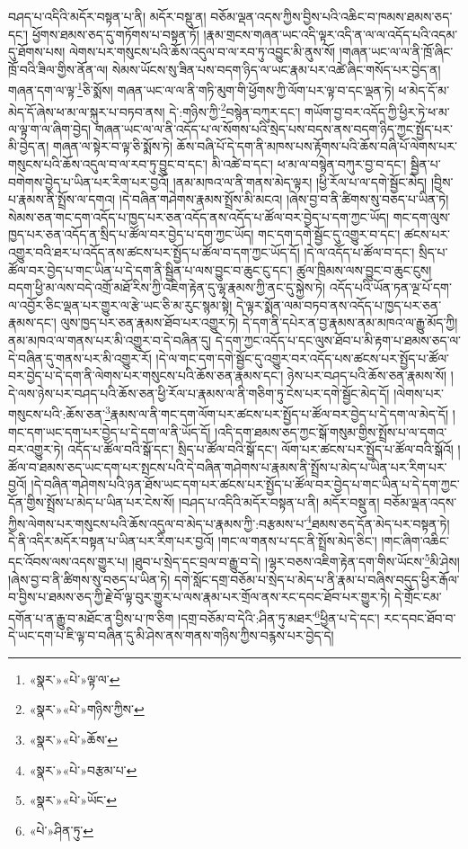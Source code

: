 བཤད་པ་འདིའི་མདོར་བསྟན་པ་ནི། མདོར་བསྡུ་ན། བཅོམ་ལྡན་འདས་ཀྱིས་བྱིས་པའི་འཆིང་བ་ཁམས་ཐམས་ཅད་དང་། ཕྱོགས་ཐམས་ཅད་དུ་གཏོགས་པ་བསྟན་ཏོ། །རྣམ་གྲངས་གཞན་ཡང་འདི་ལྟར་འདི་ན་ལ་ལ་འདོད་པའི་འདམ་དུ་ཐོགས་པས། ལེགས་པར་གསུངས་པའི་ཆོས་འདུལ་བ་ལ་རབ་ཏུ་འབྱུང་མི་ནུས་སོ། །གཞན་ཡང་ལ་ལ་ནི་ཁྲོ་ཞིང་ཁྲོ་བའི་ཟིལ་གྱིས་ནོན་ལ། སེམས་ཡོངས་སུ་ཟིན་པས་བདག་ཉིད་ལ་ཡང་རྣམ་པར་འཚེ་ཞིང་གསོད་པར་བྱེད་ན། གཞན་དག་ལ་ལྟ་\footnote{«སྣར་»«པེ་»ལྟ་ལ་}ཅི་སྨོས། གཞན་ཡང་ལ་ལ་ནི་གཏི་མུག་གི་ཕྱོགས་ཀྱི་ལོག་པར་ལྟ་བ་དང་ལྡན་ཏེ། ཕ་མེད་དོ་མ་མེད་དོ་ཞེས་ཕ་མ་ལ་སྐུར་པ་བཏབ་ནས། དེ་:གཉིས་ཀྱི་\footnote{«སྣར་»«པེ་»གཉིས་ཀྱིས་}བསྙེན་བཀུར་དང་། གཡོག་བྱ་བར་འདོད་ཀྱི་ཕྱིར་ཏེ་ཕ་མ་ལ་ལྟ་ག་ལ་ཞིག་བྱེད། གཞན་ཡང་ལ་ལ་ནི་འདོད་པ་ལ་སོགས་པའི་སྲེད་པས་བདས་ནས་བདག་ཉིད་ཀྱང་སྤྱོད་པར་མི་བྱེད་ན། གཞན་ལ་སྟེར་བ་ལྟ་ཅི་སྨོས་ཏེ། ཆོས་བཞི་པོ་དེ་དག་ནི་མཁས་པས་རྟོགས་པའི་ཆོས་བཞི་པོ་ལེགས་པར་གསུངས་པའི་ཆོས་འདུལ་བ་ལ་རབ་ཏུ་བྱུང་བ་དང་། མི་འཚེ་བ་དང་། ཕ་མ་ལ་བསྙེན་བཀུར་བྱ་བ་དང་། སྦྱིན་པ་བགེགས་བྱེད་པ་ཡིན་པར་རིག་པར་བྱའོ། །ནམ་མཁའ་ལ་ནི་གནས་མེད་ལྟར། །ཕྱི་རོལ་པ་ལ་དགེ་སྦྱོང་མེད། །བྱིས་པ་རྣམས་ནི་སྤྲོས་ལ་དགའ། །དེ་བཞིན་གཤེགས་རྣམས་སྤྲོས་མི་མངའ། །ཞེས་བྱ་བ་ནི་ཚིགས་སུ་བཅད་པ་ཡིན་ཏེ། སེམས་ཅན་གང་དག་འདོད་པ་ཁྱད་པར་ཅན་འདོད་ནས་འདོད་པ་ཚོལ་བར་བྱེད་པ་དག་ཀྱང་ཡོད། གང་དག་ལུས་ཁྱད་པར་ཅན་འདོད་ན་སྲིད་པ་ཚོལ་བར་བྱེད་པ་དག་ཀྱང་ཡོད། གང་དག་དགེ་སྦྱོང་དུ་འགྱུར་བ་དང་། ཚངས་པར་འགྱུར་བའི་ཐར་པ་འདོད་ནས་ཚངས་པར་སྤྱོད་པ་ཚོལ་བ་དག་ཀྱང་ཡོད་དོ། །དེ་ལ་འདོད་པ་ཚོལ་བ་དང་། སྲིད་པ་ཚོལ་བར་བྱེད་པ་གང་ཡིན་པ་དེ་དག་ནི་སྦྱིན་པ་ལས་བྱུང་བ་ཆུང་ངུ་དང་། ཚུལ་ཁྲིམས་ལས་བྱུང་བ་ཆུང་ངུས། བདག་ཕྱི་མ་ལས་བདེ་འགྲོ་མཐོ་རིས་ཀྱི་འཇིག་རྟེན་དུ་ལྷ་རྣམས་ཀྱི་ནང་དུ་སྐྱེས་ཏེ། འདོད་པའི་ཡོན་ཏན་ལྔ་པོ་དག་ལ་འབྱོར་ཅིང་ལྡན་པར་གྱུར་ལ་རྩེ་ཡང་ཅི་མ་རུང་སྙམ་སྟེ། དེ་ལྟར་སྨོན་ལམ་བཏབ་ནས་འདོད་པ་ཁྱད་པར་ཅན་རྣམས་དང་། ལུས་ཁྱད་པར་ཅན་རྣམས་ཐོབ་པར་འགྱུར་ཏེ། དེ་དག་ནི་དཔེར་ན་བྱ་རྣམས་ནམ་མཁའ་ལ་རྒྱུ་མོད་ཀྱི། ནམ་མཁའ་ལ་གནས་པར་མི་འགྱུར་བ་དེ་བཞིན་དུ། དེ་དག་ཀྱང་འདོད་པ་དང་ལུས་ཐོབ་པ་མི་རྟག་པ་ཐམས་ཅད་ལ་དེ་བཞིན་དུ་གནས་པར་མི་འགྱུར་རོ། །དེ་ལ་གང་དག་དགེ་སྦྱོང་དུ་འགྱུར་བར་འདོད་པས་ཚངས་པར་སྤྱོད་པ་ཚོལ་བར་བྱེད་པ་དེ་དག་ནི་ལེགས་པར་གསུངས་པའི་ཆོས་ཅན་རྣམས་དང་། ཉེས་པར་བཤད་པའི་ཆོས་ཅན་རྣམས་སོ། །དེ་ལས་ཉེས་པར་བཤད་པའི་ཆོས་ཅན་ཕྱི་རོལ་པ་རྣམས་ལ་ནི་གཅིག་ཏུ་ངེས་པར་དགེ་སྦྱོང་མེད་དོ། །ལེགས་པར་གསུངས་པའི་:ཆོས་ཅན་\footnote{«སྣར་»«པེ་»ཆོས་}རྣམས་ལ་ནི་གང་དག་ལོག་པར་ཚངས་པར་སྤྱོད་པ་ཚོལ་བར་བྱེད་པ་དེ་དག་ལ་མེད་དོ། །གང་དག་ཡང་དག་པར་བྱེད་པ་དེ་དག་ལ་ནི་ཡོད་དོ། །འདི་དག་ཐམས་ཅད་ཀྱང་སྒོ་གསུམ་གྱིས་སྤྲོས་པ་ལ་དགའ་བར་འགྱུར་ཏེ། འདོད་པ་ཚོལ་བའི་སྒོ་དང་། སྲིད་པ་ཚོལ་བའི་སྒོ་དང་། ལོག་པར་ཚངས་པར་སྤྱོད་པ་ཚོལ་བའི་སྒོའོ། །ཚོལ་བ་ཐམས་ཅད་ཡང་དག་པར་སྤངས་པའི་དེ་བཞིན་གཤེགས་པ་རྣམས་ནི་སྤྲོས་པ་མེད་པ་ཡིན་པར་རིག་པར་བྱའོ། །དེ་བཞིན་གཤེགས་པའི་ཉན་ཐོས་ཡང་དག་པར་ཚངས་པར་སྤྱོད་པ་ཚོལ་བར་བྱེད་པ་གང་ཡིན་པ་དེ་དག་ཀྱང་དོན་གྱིས་སྤྲོས་པ་མེད་པ་ཡིན་པར་ངེས་སོ། །བཤད་པ་འདིའི་མདོར་བསྟན་པ་ནི། མདོར་བསྡུ་ན། བཅོམ་ལྡན་འདས་ཀྱིས་ལེགས་པར་གསུངས་པའི་ཆོས་འདུལ་བ་མེད་པ་རྣམས་ཀྱི་:བརྩམས་པ་\footnote{«སྣར་»«པེ་»བརྩམ་པ་}ཐམས་ཅད་དོན་མེད་པར་བསྟན་ཏེ། དེ་ནི་འདིར་མདོར་བསྟན་པ་ཡིན་པར་རིག་པར་བྱའོ། །གང་ལ་གནས་པ་དང་ནི་སྤྲོས་མེད་ཅིང་། །གང་ཞིག་འཆིང་དང་འོབས་ལས་འདས་གྱུར་པ། །ཐུབ་པ་སྲེད་དང་བྲལ་བ་རྒྱུ་བ་དེ། །ལྷར་བཅས་འཇིག་རྟེན་དག་གིས་ཡོངས་\footnote{«སྣར་»«པེ་»ཡོང་}མི་ཤེས། །ཞེས་བྱ་བ་ནི་ཚིགས་སུ་བཅད་པ་ཡིན་ཏེ། དགེ་སློང་དགྲ་བཅོམ་པ་སྲེད་པ་མེད་པ་ནི་རྣམ་པ་བཞིས་བདུད་ཕྱིར་རྒོལ་བ་བྱིས་པ་ཐམས་ཅད་ཀྱི་རྗེ་བོ་ལྟ་བུར་གྱུར་པ་ལས་རྣམ་པར་གྲོལ་ནས་རང་དབང་ཐོབ་པར་གྱུར་ཏེ། དེ་གྲོང་ངམ་དགོན་པ་ན་རྒྱུ་བ་མཐོང་ན་བྱིས་པ་ཁ་ཅིག །དགྲ་བཅོམ་བ་དེའི་:ཤིན་ཏུ་མཐར་\footnote{«པེ་»ཤིན་ཏུ་}ཕྱིན་པ་དེ་དང་། རང་དབང་ཐོབ་བ་དེ་ཡང་དག་པ་ཇི་ལྟ་བ་བཞིན་དུ་མི་ཤེས་ནས་གནས་གཉིས་ཀྱིས་བརྙས་པར་བྱེད་དེ། 